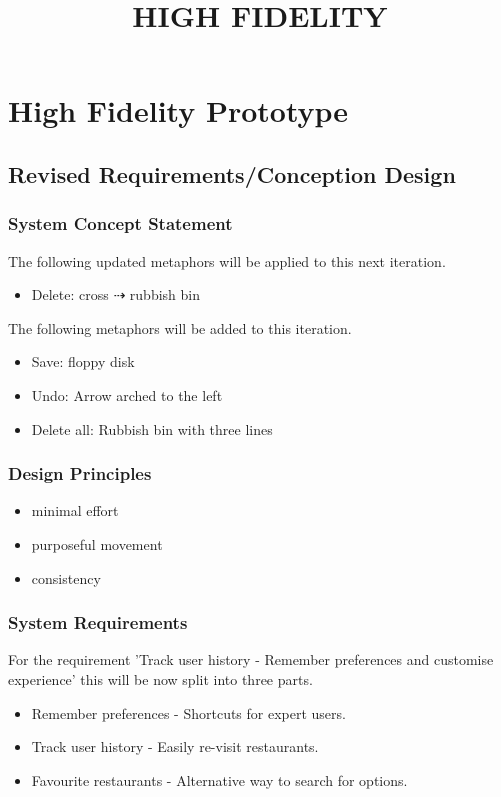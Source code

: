 \documentclass[a4 paper, 12pt]{article}
\title{HIGH FIDELITY}
\begin{document}
    
\section{High Fidelity Prototype}



    \subsection{Revised Requirements/Conception Design}

    \subsubsection*{System Concept Statement}
    
    The following updated metaphors will be applied to this next iteration.
        \begin{itemize}
            \item Delete: cross $\dashrightarrow$ rubbish bin
        \end{itemize}
    The following metaphors will be added to this iteration.
        \begin{itemize}
            \item Save: floppy disk
            \item Undo: Arrow arched to the left
            \item Delete all: Rubbish bin with three lines
        \end{itemize}

    \subsubsection*{Design Principles}
        \begin{itemize}
            \item minimal effort
            \item purposeful movement
            \item consistency
        \end{itemize}

    \subsubsection*{System Requirements}

    For the requirement 'Track user history - Remember preferences and customise experience' this will be now split into three parts. 
        \begin{itemize}
            \item Remember preferences - Shortcuts for expert users.
            \item Track user history - Easily re-visit restaurants.
            \item Favourite restaurants - Alternative way to search for options.
        \end{itemize}
\end{document}
